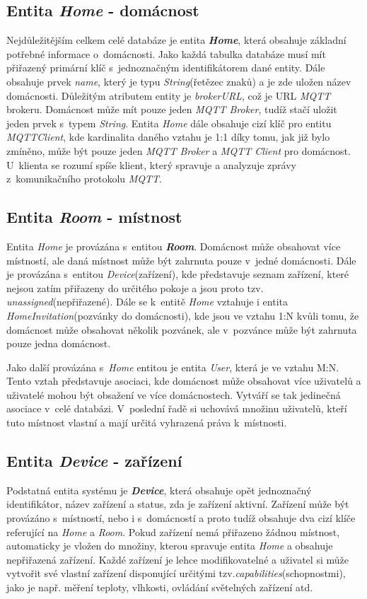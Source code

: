 \subsection*{Entita \emph{Home} - domácnost}
\label{databaze:home}
Nejdůležitějším celkem celé databáze je entita \textbf{\emph{Home}}, která obsahuje základní potřebné informace o~domácnosti.
Jako každá tabulka databáze musí mít přiřazený primární klíč s~jednoznačným identifikátorem dané entity.
Dále obsahuje prvek \emph{name}, který je typu \emph{String}(řetězec znaků) a je zde uložen název domácnosti.
Důležitým atributem entity je \emph{brokerURL}, což je URL \emph{MQTT} brokeru.
Domácnost může mít pouze jeden \emph{MQTT Broker}, tudíž stačí uložit jeden prvek s~typem \emph{String}.
Entita \emph{Home} dále obsahuje cizí klíč pro entitu \emph{MQTTClient}, kde kardinalita daného vztahu je 1:1 díky tomu, jak již bylo zmíněno, může být pouze jeden \emph{MQTT Broker} a \emph{MQTT Client} pro domácnost.
U~klienta se rozumí spíše klient, který spravuje a analyzuje zprávy z~komunikačního protokolu \emph{MQTT}.

\subsection*{Entita \emph{Room} - místnost}
\label{databaze:room}
Entita \emph{Home} je provázána s~entitou \textbf{\emph{Room}}.
Domácnost může obsahovat více místností, ale daná místnost může být zahrnuta pouze v~jedné domácnosti.
Dále je provázána s~entitou \emph{Device}(zařízení), kde představuje seznam zařízení, které nejsou zatím přiřazeny do určitého pokoje a jsou proto tzv. \emph{unassigned}(nepřiřazené).
Dále se k~entitě \emph{Home} vztahuje i entita \emph{HomeInvitation}(pozvánky do domácnosti), kde jsou ve vztahu 1:N kvůli tomu, že domácnost může obsahovat několik pozvánek, ale v~pozvánce může být zahrnuta pouze jedna domácnost.

Jako další provázána s~\emph{Home} entitou je entita \emph{User}, která je ve vztahu M:N.
Tento vztah představuje asociaci, kde domácnost může obsahovat více uživatelů a uživatelé mohou být obsažení ve více domácnostech.
Vytváří se tak jedinečná asociace v~celé databázi.
V~poslední řadě si uchovává množinu uživatelů, kteří tuto místnost vlastní a mají určitá vyhrazená práva k~místnosti.

\subsection*{Entita \emph{Device} - zařízení}
\label{databaze:device}
Podstatná entita systému je \textbf{\emph{Device}}, která obsahuje opět jednoznačný identifikátor, název zařízení a status, zda je zařízení aktivní.
Zařízení může být provázáno s~místností, nebo i s~domácností a proto tudíž obsahuje dva cizí klíče referující na \emph{Home} a \emph{Room}.
Pokud zařízení nemá přiřazeno žádnou místnost, automaticky je vložen do množiny, kterou spravuje entita \emph{Home} a obsahuje nepřiřazená zařízení.
Každé zařízení je lehce modifikovatelné a uživatel si může vytvořit své vlastní zařízení disponující určitými tzv.\emph{capabilities}(schopnostmi), jako je např. měření teploty, vlhkosti, ovládání světelných zařízení atd.

